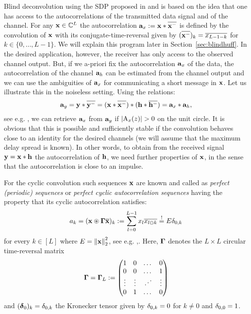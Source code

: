 \documentclass[conference]{IEEEtran}
\begin{document}
Blind deconvolution using the SDP proposed in \cite{JH16} and \cite{WJPH16a,WJPH17} is based on the idea that one has
access to the autocorrelations of the transmitted data signal and of the channel. For any ${\mathbf x}\in{\ensuremath{\mathbb C}}^L$ the autocorrelation
${\mathbf a}_x:={\mathbf x}*{\overline{{\mathbf x}^-}}$ is defined by the convolution of ${\mathbf x}$ with its conjugate-time-reversal given by
$({\overline{{\mathbf x}^-}})_k={\overline{x_{L-1-k}}}$ for $k\in\{0,\dots,L-1\}$. We will explain this program  later in
Section~\ref{sec:blindhuff}.  In the desired application, however, the receiver has only access to the observed channel
output. But, if we a-priori fix the autocorrelation ${\mathbf a}_x$ of the data, the autocorrelation of the channel ${\mathbf a}_h$ can
be estimated from the channel output and we can use the ambiguities of ${\mathbf a}_x$ for communicating a short message in ${\mathbf x}$. Let
us illustrate this in the noiseless setting.  Using the  relations:
% 
\begin{align}
  {\ensuremath{\mathbf a}}_y={\mathbf y}*{\overline{{\mathbf y}^-}}=({\mathbf x}*{\overline{{\mathbf x}^-}})* ({\mathbf h}*{\overline{{\mathbf h}^-}})={\mathbf a}_x * {\mathbf a}_h\label{eq:wienerlee},
\end{align}
%
see e.g. \cite[(2.29)]{Lue92}, we can retrieve ${\mathbf a}_x$ from ${\mathbf a}_y$ if $|\uA_x(z)|>0$ on the unit circle. It is
obvious that this is possible and sufficiently stable if the convolution behaves close to an identity for the desired
channels (we will assume that the maximum delay spread is known). In other words, to obtain from the received signal
${\mathbf y}={\mathbf x}*{\mathbf h}$ the autocorrelation of ${\mathbf h}$, we need further properties of ${\mathbf x}$, in the sense that the autocorrelation
is close to an impulse.

For the cyclic convolution such sequences ${\mathbf x}$ are known and called
as \emph{perfect (periodic) sequences}  or
\emph{perfect cyclic autocorrelation sequences} having the property
that its cyclic autocorrelation satisfies:
%
\begin{align}
  a_k=({\mathbf x}\circledast\mathbf{\Gamma}{\overline{{\mathbf x}}})_k:= \sum_{l=0}^{L-1} x_l {\overline{x_{l\ominus k}}} \overset{!}{=} E \delta_{0,k} \label{eq:ps}
\end{align}
%
for every $k\in[L]$ where $E= \left\|{\mathbf x}\right\| _2^2$, see e.g. \cite{FLG95},\cite[7]{CPW13}.
Here, $\mathbf{\Gamma}$ denotes the $L\times L$ circular time-reversal matrix
%
\begin{align}
  \mathbf{\Gamma}=\mathbf{\Gamma}_L:=\begin{pmatrix} 1 & 0 & \dots &0\\
    0 & 0 & \dots &1\\
    \vdots & \vdots & \iddots & \vdots\\
    0 & 1 & \dots & 0\end{pmatrix}
\end{align}
and $(\boldsymbol \delta_0)_k=\delta_{0,k}$ the Kronecker tensor  given by $\delta_{0,k}=0$ for $k\not=0$ and $\delta_{0,0}=1$.
% 
\end{document}
